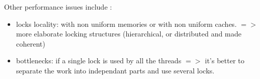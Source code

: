 Other performance issues include :

\begin{itemize}
  \item locks locality: with non uniform memories or with non uniform caches. $=>$ more elaborate locking structures (hierarchical, or distributed and made coherent)
  \item bottlenecks: if a single lock is used by all the threads $=>$ it's better to separate the work into independant parts and use several locks.
\end{itemize}

